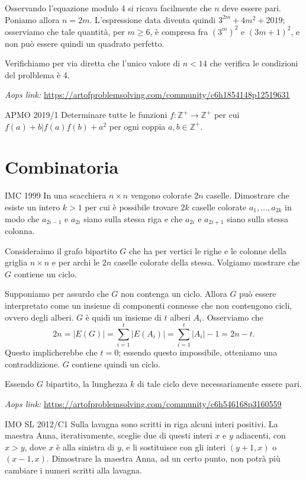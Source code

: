 \documentclass{article}
\begin{document}
Osservando l'equazione modulo 4 si ricava facilmente
che $n$ deve essere pari. Poniamo allora $n=2m$.
L'espressione data diventa quindi $3^{2m}+4m^2+2019$;
osserviamo che tale quantità, per $m\ge 6$,
è compresa fra $(3^m)^2$ e $(3m+1)^2$, e non può essere quindi
un quadrato perfetto.

Verifichiamo per via diretta che l'unico valore di $n<14$
che verifica le condizioni del prolblema è 4.

\vspace{0.5cm}
\textit{Aops link:}
\href{https://artofproblemsolving.com/community/c6h1854148p12519631}
{https://artofproblemsolving.com/community/c6h1854148p12519631}

\begin{proposition}{APMO 2019/1}{}
	Determinare tutte le funzioni $f:\mathbb{Z^+}\rightarrow\mathbb{Z^+}$
	per cui $f(a)+b\vert f(a)f(b)+a^2$ per ogni coppia $a,b\in \mathbb{Z^+}$.
\end{proposition}

\newpage
\section{Combinatoria}
\begin{proposition}{IMC 1999}{}
	In una scacchiera $n\times n$ vengono colorate  $2n$ caselle.
	Dimostrare che esiste un intero $k>1$ per cui è possibile trovare $2k$
	caselle colorate $a_1,\dots,a_{2k}$ in modo che $a_{2i-1}$ e $a_{2i}$
	siano sulla stessa riga e che $a_{2i}$ e $a_{2i+1}$ siano sulla stessa
	colonna.
\end{proposition}
Consideraimo il grafo bipartito $G$ che ha per vertici
le righe e le colonne della griglia $n\times n$ e per archi le $2n$ caselle
colorate della stessa. Volgiamo mostrare che $G$ contiene un ciclo.

Supponiamo per assurdo che $G$ non contenga un ciclo. Allora $G$ può essere
interpretato come un insieme di componenti connesse che non contengono cicli,
ovvero degli alberi. $G$ è quidi un insieme di $t$ alberi $A_i$. Osserviamo che
\[ 
	2n=\vert E(G) \vert = \sum_{i=1}^{t}\vert E(A_i)\vert=
		\sum_{i=1}^{t} \vert A_i \vert -1=2n-t.
\]
Questo implicherebbe che $t=0$; essendo questo impossibile, otteniamo una
contraddizione. $G$ contiene quindi un ciclo.

Essendo $G$ bipartito, la lunghezza $k$ di tale ciclo deve necessariamente
essere pari.

\vspace{0.5cm}
\textit{Aops link:}
\href{https://artofproblemsolving.com/community/c6h546168p3160559}
{https://artofproblemsolving.com/community/c6h546168p3160559}
\begin{proposition}{IMO SL 2012/C1}{}
	Sulla lavagna sono scritti in riga alcuni interi positivi.
	La maestra Anna, iterativamente, sceglie due di questi interi
	$x$ e $y$ adiacenti, con $x>y$, dove $x$ è alla sinistra di $y$,
	e li sostituisce con gli interi $(y+1,x)$ o $(x-1,x)$. Dimostrare
	la maestra Anna, ad un certo punto, non potrà più cambiare i numeri
	scritti alla lavagna.
\end{proposition}
\end{document}

